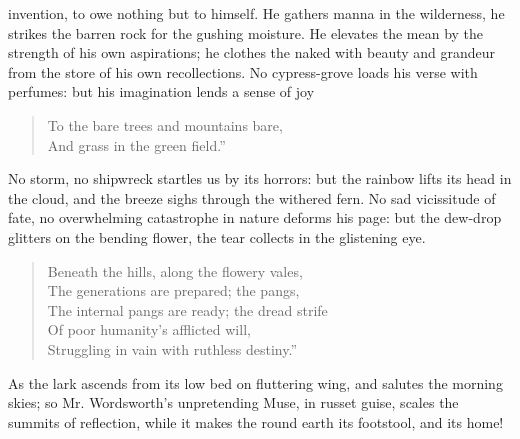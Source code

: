 invention, to owe nothing but to himself. He gathers manna in the
wilderness, he strikes the barren rock for the gushing
moisture. He elevates the mean by the strength of his own
aspirations; he clothes the naked with beauty and grandeur from
the store of his own recollections. No cypress-grove loads his
verse with perfumes: but his imagination lends a sense of joy
\begin{verse} To the bare trees and mountains
bare, \\ And grass in the green field.''
\end{verse} No storm, no shipwreck startles us by its horrors: but
the rainbow lifts its head in the cloud, and the breeze sighs
through the withered fern.  No sad vicissitude of fate, no
overwhelming catastrophe in nature deforms his page: but the
dew-drop glitters on the bending flower, the tear collects in the
glistening eye.
\begin{verse} Beneath the hills, along the flowery
vales,\\ The generations are prepared; the pangs, \\ The internal
pangs are ready; the dread strife \\ Of poor humanity's afflicted
will, \\ Struggling in vain with ruthless destiny.''
\end{verse} As the lark ascends from its low bed on fluttering
wing, and salutes the morning skies; so Mr. Wordsworth's
unpretending Muse, in russet guise, scales the summits of
reflection, while it makes the round earth its footstool, and its
home!

